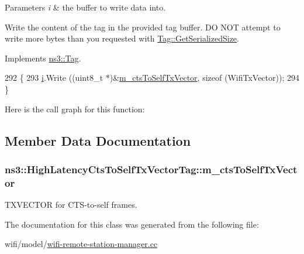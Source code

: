 \begin{DoxyParams}{Parameters}
{\em i} & the buffer to write data into.\\
\hline
\end{DoxyParams}
Write the content of the tag in the provided tag buffer. DO N\+OT attempt to write more bytes than you requested with \hyperlink{classns3_1_1Tag_a01c8efdea943fd8cce2ef5d4d67eefa6}{Tag\+::\+Get\+Serialized\+Size}. 

Implements \hyperlink{classns3_1_1Tag_ac9aa7c4f923da5d2c82de94690101dc3}{ns3\+::\+Tag}.


\begin{DoxyCode}
292 \{
293   \hyperlink{bernuolliDistribution_8m_a6f6ccfcf58b31cb6412107d9d5281426}{i}.Write ((uint8\_t *)&\hyperlink{classns3_1_1HighLatencyCtsToSelfTxVectorTag_a7ee08673e8112832c102c46adf9dadd2}{m\_ctsToSelfTxVector}, \textcolor{keyword}{sizeof} (WifiTxVector));
294 \}
\end{DoxyCode}


Here is the call graph for this function\+:




\subsection{Member Data Documentation}
\subsubsection[{\texorpdfstring{m\+\_\+cts\+To\+Self\+Tx\+Vector}{m_ctsToSelfTxVector}}]{ ns3\+::\+High\+Latency\+Cts\+To\+Self\+Tx\+Vector\+Tag\+::m\+\_\+cts\+To\+Self\+Tx\+Vector\hspace{0.3cm}{\ttfamily [private]}}\hypertarget{classns3_1_1HighLatencyCtsToSelfTxVectorTag_a7ee08673e8112832c102c46adf9dadd2}{}\label{classns3_1_1HighLatencyCtsToSelfTxVectorTag_a7ee08673e8112832c102c46adf9dadd2}


T\+X\+V\+E\+C\+T\+OR for C\+T\+S-\/to-\/self frames. 



The documentation for this class was generated from the following file\+:\begin{DoxyCompactItemize}
\item 
wifi/model/\hyperlink{wifi-remote-station-manager_8cc}{wifi-\/remote-\/station-\/manager.\+cc}\end{DoxyCompactItemize}
